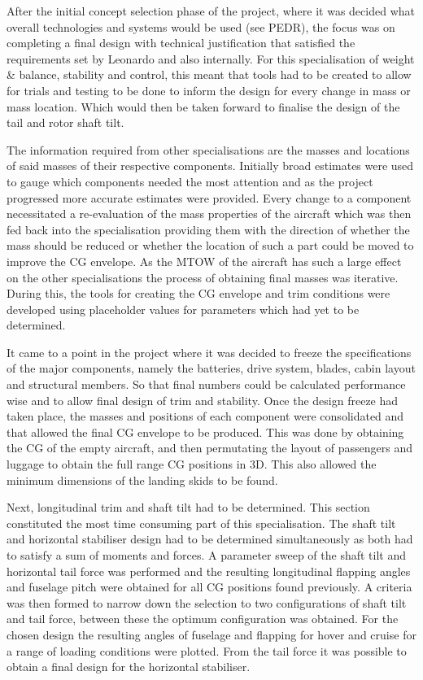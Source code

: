 \documentclass[11pt,a4paper]{article}
\begin{document}
After the initial concept selection phase of the project, where it was decided what overall technologies and systems would be used (see PEDR), the focus was on completing a final design with technical justification that satisfied the requirements set by Leonardo and also internally. For this specialisation of weight \& balance, stability and control, this meant that tools had to be created to allow for trials and testing to be done to inform the design for every change in mass or mass location. Which would then be taken forward to finalise the design of the tail and rotor shaft tilt.

The information required from other specialisations are the masses and locations of said masses of their respective components. Initially broad estimates were used to gauge which components needed the most attention and as the project progressed more accurate estimates were provided. Every change to a component necessitated a re-evaluation of the mass properties of the aircraft which was then fed back into the specialisation providing them with the direction of whether the mass should be reduced or whether the location of such a part could be moved to improve the CG envelope. As the MTOW of the aircraft has such a large effect on the other specialisations the process of obtaining final masses was iterative. During this, the tools for creating the  CG envelope and trim conditions were developed using placeholder values for parameters which had yet to be determined.

It came to a point in the project where it was decided to freeze the specifications of the major components, namely the batteries, drive system, blades, cabin layout and structural members. So that final numbers could be calculated performance wise and to allow final design of trim and stability.
Once the design freeze had taken place, the masses and positions of each component were consolidated and that allowed the final CG envelope to be produced. This was done by obtaining the CG of the empty aircraft, and then permutating the layout of passengers and luggage to obtain the full range CG positions in 3D. This also allowed the minimum dimensions of the landing skids to be found. 

Next, longitudinal trim and shaft tilt had to be determined. This section constituted the most time consuming part of this specialisation. The shaft tilt and horizontal stabiliser design had to be determined simultaneously as both had to satisfy a sum of moments and forces. A parameter sweep of the shaft tilt and horizontal tail force was performed and the resulting longitudinal flapping angles and fuselage pitch were obtained for all CG positions found previously. A criteria was then formed to narrow down the selection to two configurations of shaft tilt and tail force, between these the optimum configuration was obtained. For the chosen design the resulting angles of fuselage and flapping for hover and cruise for a range of loading conditions were plotted. From the tail force it was possible to obtain a final design for the horizontal stabiliser.
\end{document}
